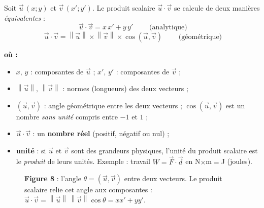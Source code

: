 \documentclass[11pt,a4paper]{article}
\newenvironment{ou}{%
  \par\smallskip\noindent\textbf{où :}\nopagebreak
  \begin{itemize}[leftmargin=1.8em,topsep=2pt,itemsep=1.5pt,parsep=0pt]}%
  {\end{itemize}}
\providecommand{\norm}[1]{\left\lVert #1\right\rVert}
\begin{document}
\begin{formule}
Soit $\vec{u}\,(x;y)$ et $\vec{v}\,(x';y')$. Le produit scalaire $\vec{u}\cdot\vec{v}$ se calcule de
deux manières \emph{équivalentes} :
\[
  \boxed{\;\vec{u}\cdot\vec{v}=x\,x'+y\,y'\;}\qquad\text{(analytique)}
\]
\[
  \boxed{\;\vec{u}\cdot\vec{v}=\norm{\vec{u}}\times\norm{\vec{v}}\times\cos(\vec{u},\vec{v})\;}\qquad\text{(géométrique)}
\]
\begin{ou}
  \item $x,\,y$ : composantes de $\vec{u}$ ; \quad $x',\,y'$ : composantes de $\vec{v}$ ;
  \item $\norm{\vec{u}},\,\norm{\vec{v}}$ : normes (longueurs) des deux vecteurs ;
  \item $(\vec{u},\vec{v})$ : angle géométrique entre les deux vecteurs ; $\cos(\vec{u},\vec{v})$ est
        un nombre \emph{sans unité} compris entre $-1$ et $1$ ;
  \item $\vec{u}\cdot\vec{v}$ : un \textbf{nombre réel} (positif, négatif ou nul) ;
  \item \textbf{unité} : si $\vec{u}$ et $\vec{v}$ sont des grandeurs physiques, l'unité du produit
        scalaire est le \emph{produit} de leurs unités. Exemple : travail $W=\vec{F}\cdot\vec{d}$ en
        \unit{\N}$\times$\unit{\m}$=$\unit{\joule} (joules).
\end{ou}
\end{formule}

\begin{figure}[h]
\centering
{}
\caption{\textbf{\textcolor{primary}{Figure 8}} : l'angle $\theta=(\vec{u},\vec{v})$ entre deux vecteurs.
Le produit scalaire relie cet angle aux composantes : $\vec{u}\cdot\vec{v}=\norm{\vec{u}}\,\norm{\vec{v}}\cos\theta=x x'+y y'$.}
\label{fig:angle}
\end{figure}
\end{document}
